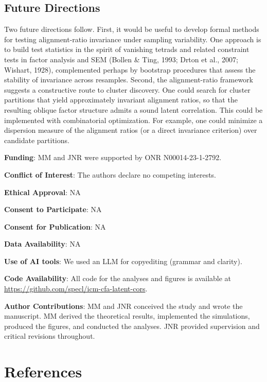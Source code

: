 \documentclass[
  american,
  man,floatsintext]{apa7}
\begin{document}
\subsection{Future Directions}\label{future-directions}

Two future directions follow. First, it would be useful to develop formal methods for testing alignment-ratio invariance under sampling variability. One approach is to build test statistics in the spirit of vanishing tetrads and related constraint tests in factor analysis and SEM (Bollen \& Ting, 1993; Drton et al., 2007; Wishart, 1928), complemented perhaps by bootstrap procedures that assess the stability of invariance across resamples. Second, the alignment-ratio framework suggests a constructive route to cluster discovery. One could search for cluster partitions that yield approximately invariant alignment ratios, so that the resulting oblique factor structure admits a sound latent correlation. This could be implemented with combinatorial optimization. For example, one could minimize a dispersion measure of the alignment ratios (or a direct invariance criterion) over candidate partitions.

\newpage

\textbf{Funding}: MM and JNR were supported by ONR N00014-23-1-2792.

\textbf{Conflict of Interest}: The authors declare no competing interests.

\textbf{Ethical Approval}: NA

\textbf{Consent to Participate}: NA

\textbf{Consent for Publication}: NA

\textbf{Data Availability}: NA

\textbf{Use of AI tools}: We used an LLM for copyediting (grammar and clarity).

\textbf{Code Availability}: All code for the analyses and figures is available at \url{https://github.com/specl/icm-cfa-latent-cors}.

\textbf{Author Contributions}: MM and JNR conceived the study and wrote the manuscript. MM derived the theoretical results, implemented the simulations, produced the figures, and conducted the analyses. JNR provided supervision and critical revisions throughout.

\newpage

\section*{References}\label{references}
\end{document}
